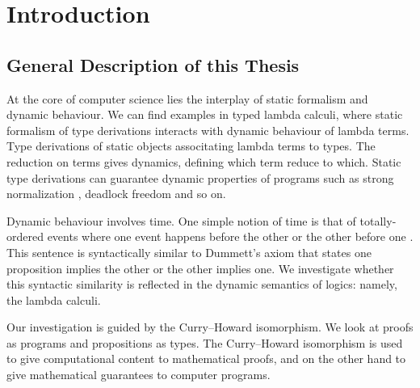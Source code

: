 \chapter{Introduction}

\section{General Description of this Thesis}





At the core of computer science lies the interplay of static formalism
and dynamic behaviour.  We can find examples in typed lambda calculi,
where static formalism of type derivations interacts with dynamic
behaviour of lambda terms.
Type derivations of static objects associtating lambda terms to types.
The reduction on terms gives dynamics, defining which term reduce
to which.  Static type derivations can guarantee dynamic properties of
programs such as strong normalization , deadlock freedom
and so on.

Dynamic behaviour involves time.
One simple notion of time is that of totally-ordered events where
one event happens before the other or the other before one .
This sentence is syntactically similar to Dummett's axiom that states
one proposition implies the other or the other implies one.
We investigate whether this syntactic similarity is reflected
in the dynamic semantics of logics: namely, the lambda calculi.


Our investigation is guided by the Curry--Howard isomorphism.
We look at proofs as programs and propositions as types.
The Curry--Howard isomorphism is used to give computational content
to mathematical proofs, and on the other hand to give mathematical
guarantees to computer programs.


